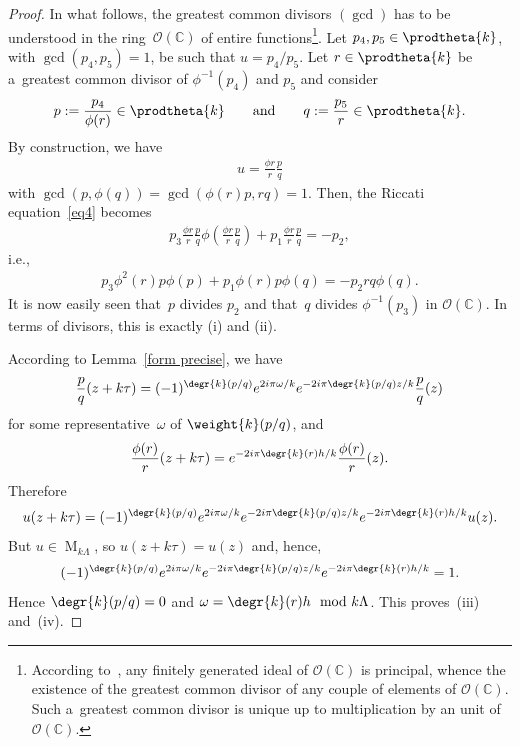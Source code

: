\documentclass[pdftex]{sigma}
\numberwithin{equation}{section}
\begin{document}
\begin{proof}
In what follows, the greatest common divisors $(\gcd)$ has to be understood in the ring~$\mathcal{O}(\mathbb C)$ of
entire functions\footnote{According to~\cite{Helmer}, any f\/initely generated ideal of $\mathcal{O}(\mathbb C)$ is
principal, whence the existence of the greatest common divisor of any couple of elements of $\mathcal{O}(\mathbb C)$.
Such a~greatest common divisor is unique up to multiplication by an unit of $\mathcal{O}(\mathbb C)$.}.
Let $p_{4}, p_{5} \in \prodtheta{k}$, with $\gcd(p_{4},p_{5})=1$, be such that $u=p_{4}/p_{5}$.
Let $r \in \prodtheta{k}$ be a~greatest common divisor of $\phi^{-1}(p_{4})$ and $p_{5}$ and consider
\begin{gather*}
p:=\frac{p_{4}}{\phi(r)} \in \prodtheta{k} \qquad \text{and} \qquad q:=\frac{p_{5}}{r} \in \prodtheta{k}.
\end{gather*}
By construction, we have
\begin{gather*}
u= \frac{\phi r}{r} \frac{p}{q}
\end{gather*}
with $\gcd(p,\phi (q))=\gcd(\phi (r) p,r q)=1$.
Then, the Riccati equation~\eqref{eq4} becomes
\begin{gather*}
p_{3} \frac{\phi r}{r} \frac{p}{q} \phi \left(\frac{\phi r}{r} \frac{p}{q}\right)+p_{1} \frac{\phi r}{r}
\frac{p}{q}=-p_{2},
\end{gather*}
i.e.,
\begin{gather*}
p_{3} \phi^{2}(r) p \phi (p)+p_{1} \phi(r) p \phi(q)=-p_{2} r q\phi(q).
\end{gather*}
It is now easily seen that~$p$ divides $p_{2}$ and that~$q$ divides $\phi^{-1}(p_{3})$ in $\mathcal{O}(\mathbb C)$.
In terms of divisors, this is exactly (i) and (ii).

According to Lemma~\ref{form precise}, we have
\begin{gather*}
\frac{p}{q}(z+k\tau)= (-1)^{\degr{k} (p/q)} e^{2i\pi \omega/k} e^{-2 i\pi \degr{k} (p/q) z/k} \frac{p}{q}(z)
\end{gather*}
for some representative~$\omega$ of $\weight{k}(p/q)$, and
\begin{gather*}
\frac{\phi(r)}{r}(z+k\tau)=e^{- 2 i\pi \degr{k} (r) h/k} \frac{\phi(r)}{r}(z).
\end{gather*}
Therefore
\begin{gather*}
u(z+k\tau)= (-1)^{\degr{k} (p/q)} e^{2i\pi \omega/k} e^{-2 i\pi \degr{k} (p/q) z/k} e^{- 2 i\pi \degr{k} (r) h/k} u(z).
\end{gather*}
But $u \in \operatorname{M}_{k\Lambda}$, so $u(z+k\tau)=u(z)$ and, hence,
\begin{gather*}
(-1)^{\degr{k} (p/q)} e^{2i\pi \omega/k} e^{-2 i\pi \degr{k} (p/q) z/k} e^{- 2 i\pi \degr{k} (r) h/k}=1.
\end{gather*}
Hence $ \degr{k} (p/q)=0$ and $\omega = \degr{k} (r) h \mod k\Lambda$.
This proves~(iii) and~(iv).
\end{proof}
\end{document}
